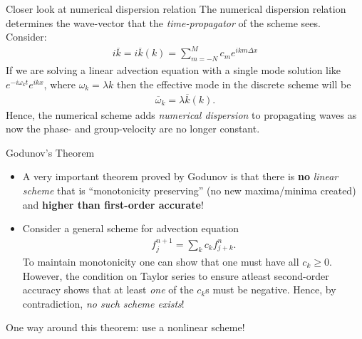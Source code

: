 \documentclass[aspectratio=169]{beamer}
\newcommand{\mypause}{}
\begin{document}
\begin{frame}{Closer look at numerical dispersion relation}
  The numerical dispersion relation determines the wave-vector that
  the \emph{time-propagator} of the scheme sees. Consider:
  \begin{align*}
    i\overline{k} = i\overline{k}(k) =  \sum_{m=-N}^{M} c_m e^{i k m \Delta x}
  \end{align*}
  If we are solving a linear advection equation with a single mode
  solution like $e^{-i \omega_k t} e^{i k x}$, where
  $\omega_k = \lambda k$ then the effective mode in the discrete
  scheme will be
  \begin{align*}
    \overline{\omega}_k = \lambda \overline{k}(k).
  \end{align*}
  Hence, the numerical scheme adds \emph{numerical dispersion} to
  propagating waves as now the phase- and group-velocity are no longer
  constant.

\end{frame}  


\begin{frame}{Godunov's Theorem}
  \small%
  \begin{itemize}
  \item A very important theorem proved by Godunov is that there is {
      \bf no} \emph{linear scheme} that is ``monotonicity preserving''
    (no new maxima/minima created) and {\bf higher than first-order
      accurate}!  \mypause%
  \item Consider a general scheme for advection equation
    \begin{align*}
      f_j^{n+1} = \sum_k c_k f_{j+k}^n.
    \end{align*}
    To maintain monotonicity one can show that one must have all
    $c_k \ge 0$. However, the condition on Taylor series to ensure
    atleast second-order accuracy shows that at least \emph{one} of
    the $c_k$s must be negative. Hence, by contradiction, \emph{no
      such scheme exists}!
  \end{itemize}
  \mypause%
  One way around this theorem: use a nonlinear scheme!
\end{frame}
\end{document}
